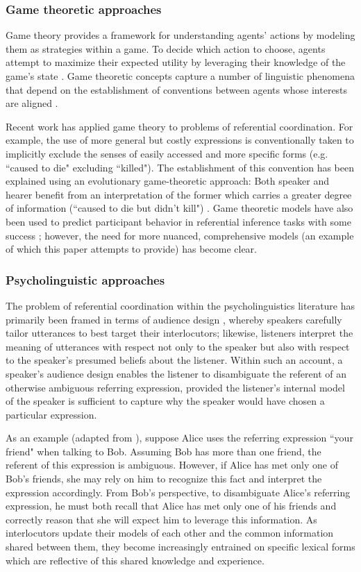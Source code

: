 \documentclass[a4paper,11pt]{article}
\begin{document}
\subsubsection{Game theoretic approaches}
Game theory provides a framework for understanding agents' actions by modeling them as strategies within a game. To decide which action to choose, agents attempt to maximize their expected utility by leveraging their knowledge of the game's state \cite{benz2005}. Game theoretic concepts capture a number of linguistic phenomena that depend on the establishment of conventions between agents whose interests are aligned \cite{lewis1969}.

Recent work has applied game theory to problems of referential coordination. For example, the use of more general but costly expressions is conventionally taken to implicitly exclude the senses of easily accessed and more specific forms (e.g. ``caused to die" excluding ``killed"). The establishment of this convention has been explained using an evolutionary game-theoretic approach: Both speaker and hearer benefit from an interpretation of the former which carries a greater degree of information (``caused to die but didn't kill") \cite{benz2005}. Game theoretic models have also been used to predict participant behavior in referential inference tasks with some success \cite{degen2012}; however, the need for more nuanced, comprehensive models (an example of which this paper attempts to provide) has become clear. 

\subsubsection{Psycholinguistic approaches}
The problem of referential coordination within the psycholinguistics literature has primarily been framed in terms of audience design \cite{clark1982}, whereby speakers carefully tailor utterances to best target their interlocutors; likewise, listeners interpret the meaning of utterances with respect not only to the speaker but also with respect to the speaker's presumed beliefs about the listener. Within such an account, a speaker's audience design enables the listener to disambiguate the referent of an otherwise ambiguous referring expression, provided the listener's internal model of the speaker is sufficient to capture why the speaker would have chosen a particular expression. 

As an example (adapted from \citeauthor{clark1982}), suppose Alice uses the referring expression ``your friend" when talking to Bob. Assuming Bob has more than one friend, the referent of this expression is ambiguous. However, if Alice has met only one of Bob's friends, she may rely on him to recognize this fact and interpret the expression accordingly. From Bob's perspective, to disambiguate Alice's referring expression, he must both recall that Alice has met only one of his friends and correctly reason that she will expect him to leverage this information. As interlocutors update their models of each other and the common information shared between them, they become increasingly entrained on specific lexical forms which are reflective of this shared knowledge and experience.
\end{document}
